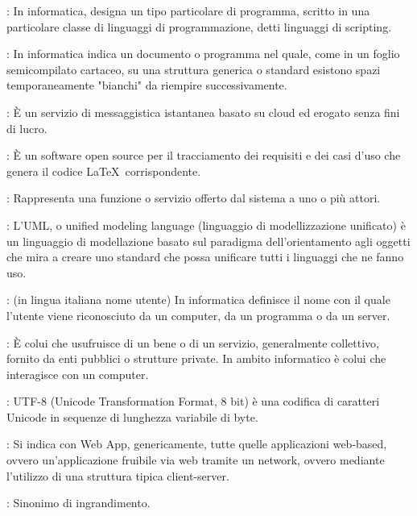 {		: In informatica, designa un tipo particolare di programma, scritto in una particolare classe di linguaggi di programmazione, detti linguaggi di scripting.


		: In informatica indica un documento o programma nel quale, come in un foglio semicompilato cartaceo, su una struttura generica o standard esistono spazi temporaneamente "bianchi" da riempire successivamente.
		
		: È un servizio di messaggistica istantanea basato su cloud ed erogato senza fini di lucro.
		
		: È un software open source per il tracciamento dei requisiti e dei casi d'uso che genera il codice \LaTeX\ corrispondente.

		
		: Rappresenta una funzione o servizio offerto dal sistema a uno o più attori.
		
		: L'UML, o unified modeling language (linguaggio di modellizzazione unificato) è un linguaggio di modellazione basato sul paradigma dell'orientamento agli oggetti
che mira a creare uno standard che possa unificare tutti i linguaggi che ne fanno uso.
		
		: (in lingua italiana nome utente) In informatica definisce il nome con il quale l'utente viene riconosciuto da un computer, da un programma o da un server.
		
		: È colui che usufruisce di un bene o di un servizio, generalmente collettivo, fornito da enti pubblici o strutture private. In ambito informatico è colui che interagisce con un computer.
	
		: UTF-8 (Unicode Transformation Format, 8 bit) è una codifica di caratteri Unicode in sequenze di lunghezza variabile di byte.


		: Si indica con Web App, genericamente, tutte quelle applicazioni web-based, ovvero un'applicazione fruibile via web tramite un network, ovvero
mediante l'utilizzo di una struttura tipica client-server.


		: Sinonimo di ingrandimento.
	 }
	 
